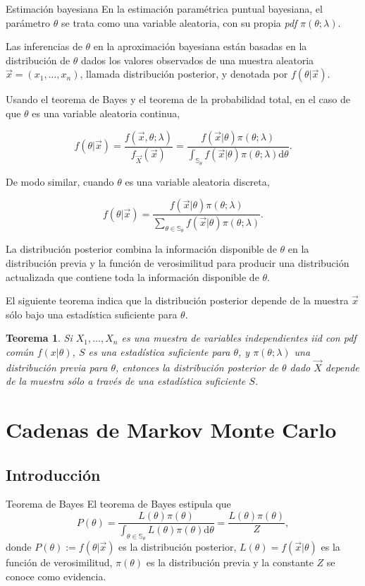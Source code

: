 \documentclass{beamer}
\newtheorem{theo}{Teorema}[section]
\begin{document}
	\begin{frame}[allowframebreaks]{Estimación bayesiana}
		En la estimación paramétrica puntual bayesiana, el parámetro $\theta$ se trata como una variable aleatoria, con su propia \textit{pdf} $\pi(\theta;\lambda)$.
		
		Las inferencias de $\theta$ en la aproximación bayesiana están basadas en la distribución de $\theta$ dados los valores observados de una muestra aleatoria $\vec{x}=(x_1,\dots,x_n)$, llamada distribución posterior, y denotada por $f(\theta | \vec{x})$.
		
		Usando el teorema de Bayes y el teorema de la probabilidad total, en el caso de que $\theta$ es una variable aleatoria continua,
		
		$$f(\theta | \vec{x})=\frac{f(\vec{x},\theta;\lambda)}{f_{\vec{X}}(\vec{x})}=\frac{f(\vec{x}|\theta)\pi(\theta;\lambda)}{\int_{\mathbb{S}_\theta}f(\vec{x}|\theta)\pi(\theta;\lambda)\mathrm{d}\theta}.$$
		
		De modo similar, cuando $\theta$ es una variable aleatoria discreta,
		
		$$f(\theta|\vec{x})=\frac{f(\vec{x}|\theta)\pi(\theta;\lambda)}{\sum_{\theta\in\mathbb{S}_\theta}f(\vec{x}|\theta)\pi(\theta;\lambda)}.$$
		
		La distribución posterior combina la información disponible de $\theta$ en la distribución previa y la función de verosimilitud para producir una distribución actualizada que contiene toda la información disponible de $\theta$.
		
El siguiente teorema indica que la distribución posterior depende de la muestra $\vec{x}$ sólo bajo una estadística suficiente para $\theta$.
		
		\begin{theo}
			Si $X_1,\dots,X_n$ es una muestra de variables independientes iid con pdf común $f(x|\theta)$, $S$ es una estadística suficiente para $\theta$, y $\pi(\theta;\lambda)$ una distribución previa para $\theta$, entonces la distribución posterior de $\theta$ dado $\vec{X}$ depende de la muestra sólo a través de una estadística suficiente $S$.
		\end{theo}
	\end{frame}
	
	\section{Cadenas de Markov Monte Carlo}
	\subsection{Introducción}
	\begin{frame}{Teorema de Bayes}
	El teorema de Bayes estipula que
	\begin{equation}
			P(\theta)=\frac{L(\theta)\pi(\theta)}{\int_{\theta\in\mathbb{S}_\theta}L(\theta)\pi(\theta)\mathrm{d}\theta}=\frac{L(\theta)\pi(\theta)}{Z},
		\end{equation}
		donde $P(\theta):=f(\theta|\vec{x})$ es la distribución posterior, $L(\theta)=f(\vec{x}|\theta)$ es la función de verosimilitud, $\pi(\theta)$ es la distribución previa y la constante $Z$ se conoce como evidencia.
	\end{frame}
	
\end{document}
